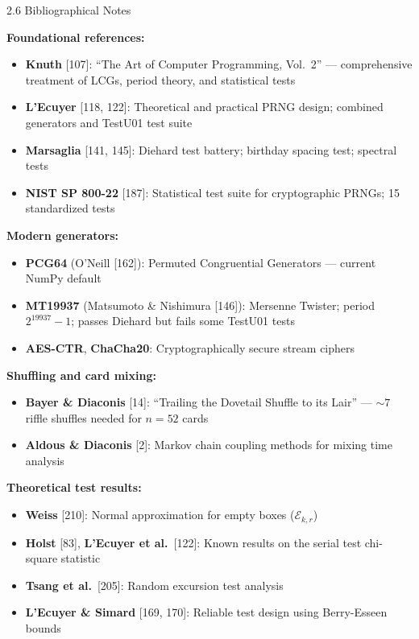\documentclass[aspectratio=169,10pt]{beamer}
\begin{document}
\begin{frame}[allowframebreaks]{2.6 Bibliographical Notes}

\textbf{Foundational references:}
\begin{itemize}
  \item \textbf{Knuth} [107]: ``The Art of Computer Programming, Vol.\ 2'' ---
    comprehensive treatment of LCGs, period theory, and statistical tests
  \item \textbf{L'Ecuyer} [118, 122]: Theoretical and practical PRNG design;
    combined generators and TestU01 test suite
  \item \textbf{Marsaglia} [141, 145]: Diehard test battery; birthday spacing test;
    spectral tests
  \item \textbf{NIST SP 800-22} [187]: Statistical test suite for cryptographic PRNGs;
    15 standardized tests
\end{itemize}

\medskip
\textbf{Modern generators:}
\begin{itemize}
  \item \textbf{PCG64} (O'Neill [162]): Permuted Congruential Generators --- current
    NumPy default
  \item \textbf{MT19937} (Matsumoto \& Nishimura [146]): Mersenne Twister;
    period $2^{19937}-1$; passes Diehard but fails some TestU01 tests
  \item \textbf{AES-CTR}, \textbf{ChaCha20}: Cryptographically secure stream ciphers
\end{itemize}

\framebreak

\textbf{Shuffling and card mixing:}
\begin{itemize}
  \item \textbf{Bayer \& Diaconis} [14]: ``Trailing the Dovetail Shuffle to its
    Lair'' --- $\sim 7$ riffle shuffles needed for $n=52$ cards
  \item \textbf{Aldous \& Diaconis} [2]: Markov chain coupling methods for
    mixing time analysis
\end{itemize}

\medskip
\textbf{Theoretical test results:}
\begin{itemize}
  \item \textbf{Weiss} [210]: Normal approximation for empty boxes ($\mathcal{E}_{k,r}$)
  \item \textbf{Holst} [83], \textbf{L'Ecuyer et al.}\ [122]: Known results on the
    serial test chi-square statistic
  \item \textbf{Tsang et al.}\ [205]: Random excursion test analysis
  \item \textbf{L'Ecuyer \& Simard} [169, 170]: Reliable test design using
    Berry-Esseen bounds
\end{itemize}

\end{frame}
\end{document}
